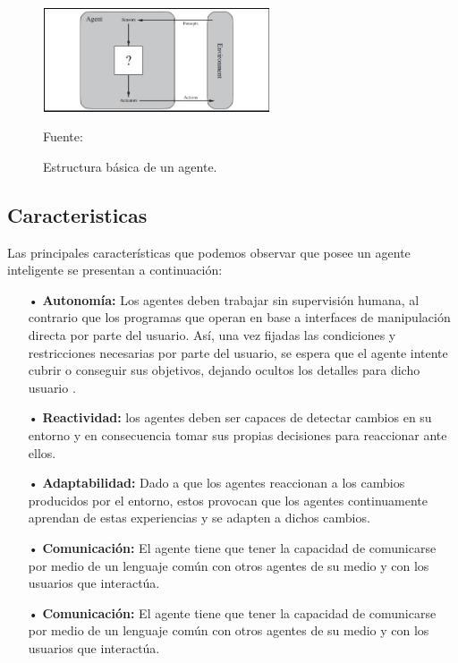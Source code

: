 \begin{figure}[ht]
\begin{center}
\includegraphics[width=0.6\textwidth]{image/Figura1}
\end{center}
\begin{center}
\vskip -0.5cm
\caption{\small{Estructura básica de un agente.}}
{\small{Fuente: \cite{Russel}}}
\end{center}
\end{figure}


\subsection{Caracteristicas}
Las principales características que podemos observar que  posee un agente inteligente se presentan a continuación:

\begin{enumerate}
\item[•] {\bf Autonomía:} Los agentes deben trabajar sin supervisión humana, al contrario que los programas que operan en base a interfaces de manipulación directa por parte del usuario. Así, una vez fijadas las condiciones y restricciones necesarias por parte del usuario, se espera que el agente intente cubrir o conseguir sus objetivos, dejando ocultos los detalles para dicho usuario \citep{Michael}.
\item[•] {\bf Reactividad:} los agentes deben ser capaces de detectar cambios en su entorno y en consecuencia tomar sus propias decisiones para reaccionar ante ellos.
\item[•] {\bf Adaptabilidad:} Dado a que los agentes reaccionan a los cambios producidos por el entorno, estos provocan que los agentes continuamente aprendan de estas experiencias y se adapten a dichos cambios.
\item[•] {\bf Comunicación:} El agente tiene que tener la capacidad de comunicarse por medio de un lenguaje común con otros agentes de su medio y con los usuarios que interactúa.

\item[•] {\bf Comunicación:} El agente tiene que tener la capacidad de comunicarse por medio de un lenguaje común con otros agentes de su medio y con los usuarios que interactúa.

\end{enumerate}


